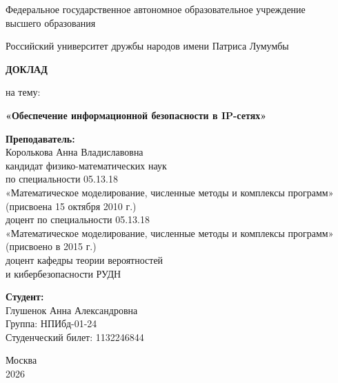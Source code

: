 \begin{titlepage}
\begin{center}

Федеральное государственное автономное образовательное учреждение \\
высшего образования

\vspace{1cm}

Российский университет дружбы народов имени Патриса Лумумбы

\vspace{3cm}

{\Large\bfseries ДОКЛАД}

\vspace{0.5cm}

на тему:

\vspace{0.5cm}

{\large\bfseries «Обеспечение информационной безопасности в IP-сетях»}

\vspace{3cm}

\end{center}

\begin{flushright}
\begin{minipage}{0.55\textwidth}
\textbf{Преподаватель:} \\
Королькова Анна Владиславовна \\
кандидат физико-математических наук \\
по специальности 05.13.18 \\
«Математическое моделирование, численные методы и комплексы программ» \\
(присвоена 15 октября 2010 г.) \\
доцент по специальности 05.13.18 \\
«Математическое моделирование, численные методы и комплексы программ» \\
(присвоено в 2015 г.) \\
доцент кафедры теории вероятностей \\
и кибербезопасности РУДН

\vspace{0.8cm}

\textbf{Студент:} \\
Глушенок Анна Александровна \\
Группа: НПИбд-01-24 \\
Студенческий билет: 1132246844
\end{minipage}
\end{flushright}

\vfill

\begin{center}
Москва \\[0.2cm]
2026
\end{center}

\end{titlepage}

\renewcommand{\figurename}{}
\renewcommand{\tablename}{}

\newpage
